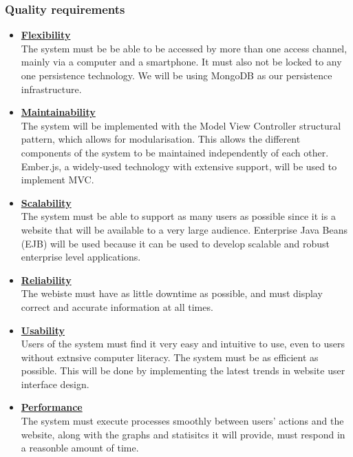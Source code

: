 \documentclass[a4paper,12pt]{article}
\begin{document}
\subsubsection{Quality requirements}
	\begin{itemize}
		\item{\bfseries \underline{Flexibility}}\\[0.4cm]
		The system must be be able to be accessed  by more than one access channel, mainly via a computer and a 		 		smartphone. It must also not be locked to any one persistence technology. We will be using MongoDB as our persistence 			infrastructure.
		
		\item{\bfseries \underline{Maintainability}}\\[0.4cm]
		The system will be implemented with the Model View Controller structural pattern, which allows for modularisation. This 			allows the different components of the system to be maintained independently of each other. Ember.js, a 					widely-used technology with extensive support, will be used to implement MVC.
		
		\item{\bfseries \underline{Scalability}}\\[0.4cm]
		The system must be able to support as many users as possible since it is a website that will be available to a very large 			audience. Enterprise Java Beans (EJB) will be used because it can be used to develop scalable and robust enterprise 			level applications.
		
		\item{\bfseries \underline{Reliability}}\\[0.4cm]
		The webiste must have as little downtime as possible, and must display correct and accurate information at all times.
		
		\item{\bfseries \underline{Usability}}\\[0.4cm]
		Users of the system must find it very easy and intuitive to use, even to users without extnsive computer literacy. The 			system must be as efficient as possible. This will be done by implementing the latest trends in website user interface 			design.
		
		\item{\bfseries \underline{Performance}}\\[0.4cm]
		The system must execute processes smoothly between users' actions and the website, along with the graphs and 			statisitcs it will provide, must respond in a reasonble amount of time.
		

\end{itemize}
\end{document}
